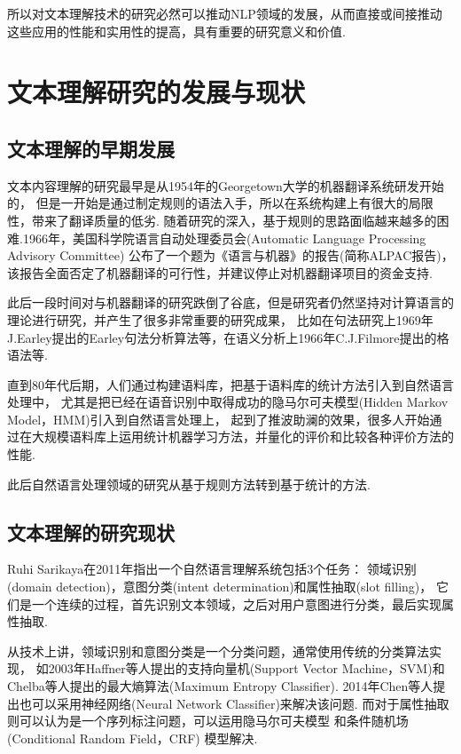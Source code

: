\documentclass[bachelor,winfonts]{jnuthesis}
\begin{document}
所以对文本理解技术的研究必然可以推动NLP领域的发展，从而直接或间接推动这些应用的性能和实用性的提高，具有重要的研究意义和价值.

\section{文本理解研究的发展与现状}
\subsection{文本理解的早期发展}
文本内容理解的研究最早是从1954年的Georgetown大学的机器翻译系统\cite{SlocumMachine}研发开始的，
但是一开始是通过制定规则的语法入手，所以在系统构建上有很大的局限性，带来了翻译质量的低劣.
随着研究的深入，基于规则的思路面临越来越多的困难.1966年，美国科学院语言自动处理委员会(Automatic Language Processing Advisory Committee)
公布了一个题为《语言与机器》的报告(简称ALPAC报告\cite{Pardelli2008From})，该报告全面否定了机器翻译的可行性，并建议停止对机器翻译项目的资金支持.

此后一段时间对与机器翻译的研究跌倒了谷底，但是研究者仍然坚持对计算语言的理论进行研究，并产生了很多非常重要的研究成果，
比如在句法研究上1969年J.Earley提出的Earley句法分析算法\cite{Earley1970An}等，在语义分析上1966年C.J.Filmore提出的格语法等.


直到80年代后期，人们通过构建语料库，把基于语料库的统计方法引入到自然语言处理中，
尤其是把已经在语音识别中取得成功的隐马尔可夫模型(Hidden Markov Model，HMM)\cite{Bangalore2010Sequence}引入到自然语言处理上，
起到了推波助澜的效果，很多人开始通过在大规模语料库上运用统计机器学习方法，并量化的评价和比较各种评价方法的性能.


此后自然语言处理领域的研究从基于规则方法转到基于统计的方法.

\subsection{文本理解的研究现状}
Ruhi Sarikaya在2011年指出一个自然语言理解系统包括3个任务：
领域识别(domain detection)，意图分类(intent determination)和属性抽取(slot filling)\cite{Sarikaya2011Deep}，
它们是一个连续的过程，首先识别文本领域，之后对用户意图进行分类，最后实现属性抽取.

从技术上讲，领域识别和意图分类是一个分类问题，通常使用传统的分类算法实现，
如2003年Haffner等人\cite{Bangalore2010Sequence}提出的支持向量机(Support Vector Machine，SVM)和
Chelba等人\cite{Chen2011Maximum}提出的最大熵算法(Maximum Entropy Classifier).
2014年Chen等人\cite{Ravuri2015Recurrent}提出也可以采用神经网络(Neural Network Classifier)来解决该问题.
而对于属性抽取则可以认为是一个序列标注问题，可以运用隐马尔可夫模型
和条件随机场(Conditional Random Field，CRF) 模型解决.
\end{document}
